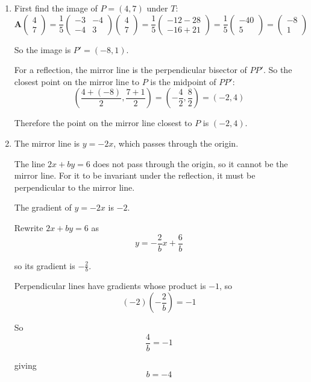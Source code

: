 \documentclass[leqno]{article}
\begin{document}
\begin{enumerate}[
  label=\textbf{\arabic*.},
  leftmargin=*,
  topsep=0pt,
  partopsep=0pt,
  parsep=0pt
]
\begin{djsSolution}
\begin{enumerate}[label=\textbf{(\alph*)}]
  \item First find the image of $P=(4,7)$ under $T$:
  \[
  \mathbf{A}\begin{pmatrix}4\\7\end{pmatrix}
  =
  \frac{1}{5}
  \begin{pmatrix}
  -3 & -4\\
  -4 & 3
  \end{pmatrix}
  \begin{pmatrix}4\\7\end{pmatrix}
  =
  \frac{1}{5}
  \begin{pmatrix}
  -12-28\\
  -16+21
  \end{pmatrix}
  =
  \frac{1}{5}
  \begin{pmatrix}
  -40\\
  5
  \end{pmatrix}
  =
  \begin{pmatrix}
  -8\\
  1
  \end{pmatrix}
  \]

  So the image is $P'=(-8,1)$.

  For a reflection, the mirror line is the perpendicular bisector of $PP'$. So the closest point on the mirror line to $P$ is the midpoint of $PP'$:
  \[
  \left(\frac{4+(-8)}{2},\frac{7+1}{2}\right)
  =
  \left(-\frac{4}{2},\frac{8}{2}\right)
  =
  (-2,4)
  \]

  Therefore the point on the mirror line closest to $P$ is $(-2,4)$.

  \item The mirror line is $y=-2x$, which passes through the origin.

  The line $2x+by=6$ does not pass through the origin, so it cannot be the mirror line. For it to be invariant under the reflection, it must be perpendicular to the mirror line.

  The gradient of $y=-2x$ is $-2$.

  Rewrite $2x+by=6$ as
  \[
  y=-\frac{2}{b}x+\frac{6}{b}
  \]

  so its gradient is $-\frac{2}{b}$.

  Perpendicular lines have gradients whose product is $-1$, so
  \[
  (-2)\left(-\frac{2}{b}\right)=-1
  \]

  So
  \[
  \frac{4}{b}=-1
  \]

  giving
  \[
  b=-4
  \]
\end{enumerate}
\end{djsSolution}



\end{enumerate}
\end{document}
